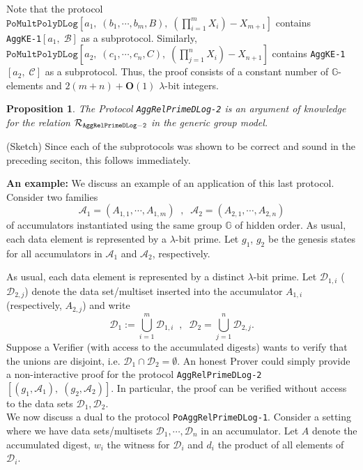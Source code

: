 \documentclass[11pt, lettersize, notitlepage, leqno, footskip=0.6cm]{article}
\newcommand{\pl}{\prod\limits}
\newcommand{\ttt}{\texttt}
\newcommand{\mc}{\mathcal}
\newcommand{\mb}{\mathbb}
\newcommand{\mbf}{\mathbf}
\newcommand{\lam}{\lambda}
\newcommand{\lamb}{\lambda}
\newcommand{\bO}{\mbf{O}}
\newcommand{\noin}{\noindent}
\newtheorem{Prop}[Thm]{Proposition}
\numberwithin{equation}{section}
\begin{document}
\noin Note that the protocol $\ttt{PoMultPolyDLog}[a_1,\;(b_1,\cdots,b_m, B),\; (\pl_{i=1}^m X_i) -X_{m+1}]$ contains\\ \verb|AggKE-1|$[a_1,\;\mc{B}]$ as a subprotocol. Similarly, $\ttt{PoMultPolyDLog}[a_2,\;(c_1,\cdots,c_n, C),\; (\pl_{j=1}^n X_i) -X_{n+1}]$ contains \verb|AggKE-1|$[a_2,\;\mc{C}]$ as a subprotocol. Thus, the proof consists of a constant number of $\mb{G}$-elements and $2(m+n)+\bO(1)$ $\lam$-bit integers.\vspace{0.2cm}


\begin{Prop} The Protocol \verb|AggRelPrimeDLog-2| is an argument of knowledge for the relation $\mc{R}_{\tt{AggRelPrimeDLog-2}}$ in the generic group
model.\end{Prop}

\begin{prf} (Sketch) Since each of the subprotocols was shown to be correct and sound in the preceding seciton, this follows immediately.\end{prf}

\noindent \textbf{An example:} We discuss an example of an application of this last protocol. Consider two families \vspace{-0.1cm}$$\mc{A}_1 = (A_{1,1},\cdots,A_{1, m})\;\; , \;\; \mc{A}_2 = (A_{2,1},\cdots,A_{2, n}) $$ of accumulators instantiated using the same group $\mb{G}$ of hidden order. As usual, each data element is represented by a $\lam$-bit prime. Let $g_1$, $g_2$ be the genesis states for all accumulators in $\mc{A}_1$ and $\mc{A}_2$, respectively. 

As usual, each data element is represented by a distinct $\lamb$-bit prime. Let $\mc{D}_{1, i}$ ($\mc{D}_{2, j}$) denote the data set/multiset inserted into the accumulator $A_{1, i}$ (respectively, $A_{2, j}$) and write $$\mc{D}_1 := \bigcup\limits_{i=1}^m  \mc{D}_{1,i}\;\; ,\;\;\mc{D}_2 = \bigcup\limits_{j=1}^n  \mc{D}_{2,j}.$$ Suppose a Verifier (with access to the accumulated digests) wants to verify that the unions are disjoint, i.e. $\mc{D}_1 \cap \mc{D}_2 = \emptyset.$ An honest Prover could simply provide a non-interactive proof for the protocol \verb|AggRelPrimeDLog-2|$[(g_1, \mc{A}_1) ,\;(g_2, \mc{A}_2)]$. In particular, the proof can be verified without access to the data sets $\mc{D}_{1}, \mc{D}_{2}$. \\


We now discuss a dual to the protocol \verb|PoAggRelPrimeDLog-1|. Consider a setting where we have data sets/multisets $\mc{D}_1,\cdots, \mc{D}_n$ in an accumulator. Let $A$ denote the accumulated digest, $w_i$ the witness for $\mc{D}_i$ and $d_i$ the product of all elements of $\mc{D}_i$. 
\end{document}
